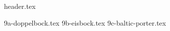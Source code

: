 \clearpage
{}
\divisorLine
{header.tex}
\begin{multicols}{2}
{9a-doppelbock.tex}
{9b-eisbock.tex}
{9c-baltic-porter.tex}
\end{multicols}